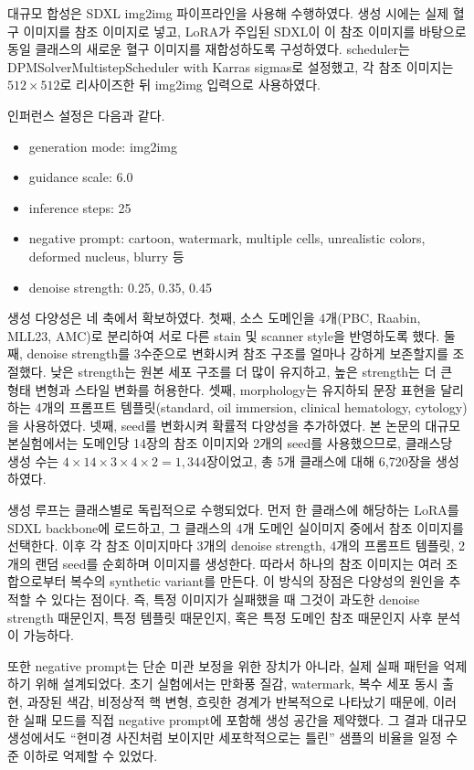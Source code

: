 \documentclass[11pt]{article}
\begin{document}
대규모 합성은 SDXL img2img 파이프라인을 사용해 수행하였다. 생성 시에는 실제 혈구 이미지를 참조 이미지로 넣고, LoRA가 주입된 SDXL이 이 참조 이미지를 바탕으로 동일 클래스의 새로운 혈구 이미지를 재합성하도록 구성하였다. scheduler는 DPMSolverMultistepScheduler with Karras sigmas로 설정했고, 각 참조 이미지는 $512 \times 512$로 리사이즈한 뒤 img2img 입력으로 사용하였다.

인퍼런스 설정은 다음과 같다.
\begin{itemize}
  \item generation mode: img2img
  \item guidance scale: 6.0
  \item inference steps: 25
  \item negative prompt: cartoon, watermark, multiple cells, unrealistic colors, deformed nucleus, blurry 등
  \item denoise strength: 0.25, 0.35, 0.45
\end{itemize}

생성 다양성은 네 축에서 확보하였다. 첫째, 소스 도메인을 4개(PBC, Raabin, MLL23, AMC)로 분리하여 서로 다른 stain 및 scanner style을 반영하도록 했다. 둘째, denoise strength를 3수준으로 변화시켜 참조 구조를 얼마나 강하게 보존할지를 조절했다. 낮은 strength는 원본 세포 구조를 더 많이 유지하고, 높은 strength는 더 큰 형태 변형과 스타일 변화를 허용한다. 셋째, morphology는 유지하되 문장 표현을 달리하는 4개의 프롬프트 템플릿(standard, oil immersion, clinical hematology, cytology)을 사용하였다. 넷째, seed를 변화시켜 확률적 다양성을 추가하였다. 본 논문의 대규모 본실험에서는 도메인당 14장의 참조 이미지와 2개의 seed를 사용했으므로, 클래스당 생성 수는 $4 \times 14 \times 3 \times 4 \times 2 = 1,344$장이었고, 총 5개 클래스에 대해 6,720장을 생성하였다.

생성 루프는 클래스별로 독립적으로 수행되었다. 먼저 한 클래스에 해당하는 LoRA를 SDXL backbone에 로드하고, 그 클래스의 4개 도메인 실이미지 중에서 참조 이미지를 선택한다. 이후 각 참조 이미지마다 3개의 denoise strength, 4개의 프롬프트 템플릿, 2개의 랜덤 seed를 순회하며 이미지를 생성한다. 따라서 하나의 참조 이미지는 여러 조합으로부터 복수의 synthetic variant를 만든다. 이 방식의 장점은 다양성의 원인을 추적할 수 있다는 점이다. 즉, 특정 이미지가 실패했을 때 그것이 과도한 denoise strength 때문인지, 특정 템플릿 때문인지, 혹은 특정 도메인 참조 때문인지 사후 분석이 가능하다.

또한 negative prompt는 단순 미관 보정을 위한 장치가 아니라, 실제 실패 패턴을 억제하기 위해 설계되었다. 초기 실험에서는 만화풍 질감, watermark, 복수 세포 동시 출현, 과장된 색감, 비정상적 핵 변형, 흐릿한 경계가 반복적으로 나타났기 때문에, 이러한 실패 모드를 직접 negative prompt에 포함해 생성 공간을 제약했다. 그 결과 대규모 생성에서도 ``현미경 사진처럼 보이지만 세포학적으로는 틀린'' 샘플의 비율을 일정 수준 이하로 억제할 수 있었다.
\end{document}
